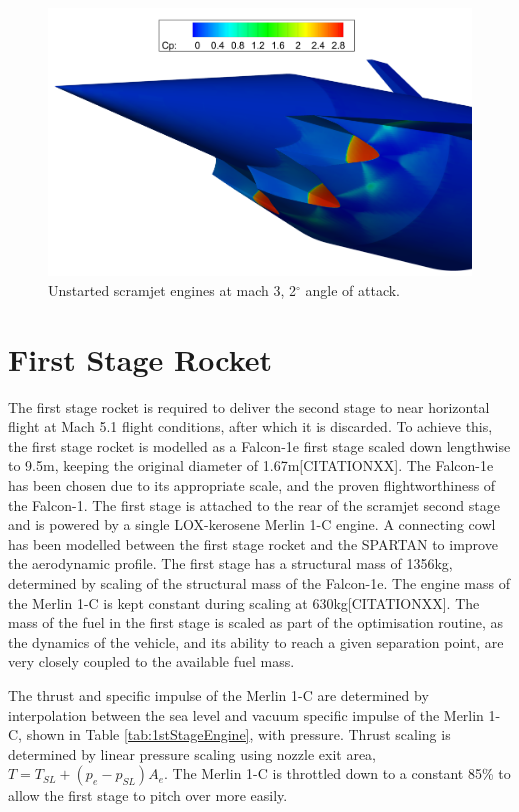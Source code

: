 \begin{figure}[ht]
	\centering
	\includegraphics[width=0.7\linewidth]{figures/3_vehicle_design/Unstart}
	\caption{Unstarted scramjet engines at mach 3, 2$^\circ$ angle of attack.}
	\label{fig:Unstart}
\end{figure}


\section{First Stage Rocket}
The first stage rocket is required to deliver the second stage to near horizontal flight at Mach 5.1 flight conditions,
after which it is discarded. To achieve this, the first stage rocket is modelled as a Falcon-1e first stage scaled down
lengthwise to 9.5m, keeping the original diameter of 1.67m[CITATIONXX]. 
The Falcon-1e has been chosen due to its appropriate scale, and the proven flightworthiness of the Falcon-1. 
 The first stage is attached to the rear of the scramjet
second stage and is powered by a single LOX-kerosene Merlin 1-C engine. A connecting cowl has been modelled between the first stage rocket and the SPARTAN to improve the aerodynamic profile.  The first stage has a structural mass of
1356kg, determined by scaling of the structural mass of the Falcon-1e. The engine mass of the Merlin 1-C is kept constant during scaling at 630kg[CITATIONXX]. The mass of the
fuel in the first stage is scaled as part of the optimisation routine, as the dynamics of the vehicle, and its ability to reach a
given separation point, are very closely coupled to the available fuel mass.

The thrust and specific impulse of the Merlin 1-C are determined by interpolation between the sea level and vacuum specific impulse of the Merlin 1-C, shown in Table \ref{tab:1stStageEngine}, with pressure. Thrust scaling is determined by linear pressure scaling using nozzle exit area, $T = T_{SL} + (p_e - p_{SL})A_e$. 
 The Merlin 1-C is throttled down to a constant 85\% to allow the first stage to pitch over more easily.

